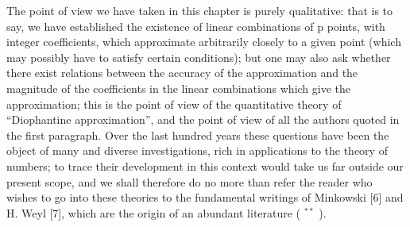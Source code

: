 The point of view we have taken in this chapter is purely qualitative: that is to say, we have established the existence of linear combinations of p points, with integer coefficients, which approximate arbitrarily closely to a given point (which may possibly have to satisfy certain conditions); but one may also ask whether there exist relations between the accuracy of the approximation and the magnitude of the coefficients in the linear combinations which give the approximation; this is the point of view of the quantitative theory of ``Diophantine approximation'', and the point of view of all the authors quoted in the first paragraph. Over the last hundred years these questions have been the object of many and diverse investigations, rich in applications to the theory of numbers; to trace their development in this context would take us far outside our present scope, and we shall therefore do no more than refer the reader who wishes to go into these theories to the fundamental writings of Minkowski {[}6{]} and H. Weyl {[}7{]}, which are the origin of an abundant literature ( \(^{**}\) ).

